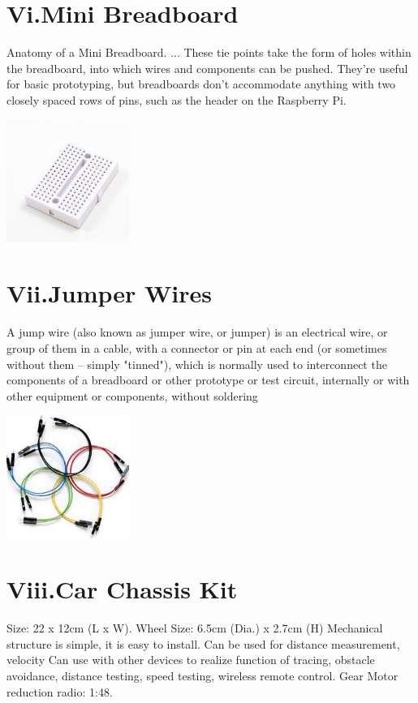 \documentclass[12pt]{article}
\begin{document}
\section*{Vi.Mini Breadboard}
Anatomy of a Mini Breadboard. ... These tie points take the form of holes within the breadboard, into which wires and components can be pushed. They're useful for basic prototyping, but breadboards don't accommodate anything with two closely spaced rows of pins, such as the header on the Raspberry Pi.

\includegraphics[height=4cm]{B.jpg}

\pagebreak
\section*{Vii.Jumper Wires}
A jump wire (also known as jumper wire, or jumper) is an electrical wire, or group of them in a cable, with a connector or pin at each end (or sometimes without them – simply "tinned"), which is normally used to interconnect the components of a breadboard or other prototype or test circuit, internally or with other equipment or components, without soldering

\includegraphics[height=4cm]{J.jpg}

\section*{Viii.Car Chassis Kit}
Size: 22 x 12cm (L x W).
Wheel Size: 6.5cm (Dia.) x 2.7cm (H)
Mechanical structure is simple, it is easy to install.
Can be used for distance measurement, velocity
Can use with other devices to realize function of tracing, obstacle avoidance, distance testing, speed testing, wireless remote control.
Gear Motor reduction radio: 1:48.
\end{document}
